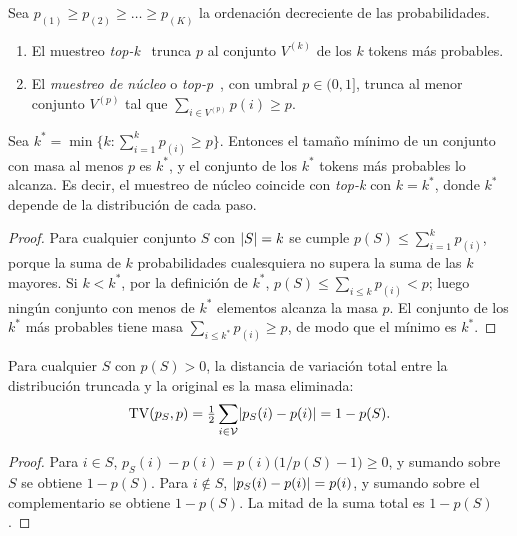 \begin{definicion}\label{def:topk-topp}
Sea $p_{(1)}\ge p_{(2)}\ge\dots\ge p_{(K)}$ la ordenación decreciente de las probabilidades.
\begin{enumerate}[label=(\alph*)]
  \item El muestreo \emph{top-k}~\cite[§5.4]{fan} trunca $p$ al conjunto $V^{(k)}$ de los $k$ tokens más probables.
  \item El \emph{muestreo de núcleo} o \emph{top-p}~\cite[§3.1]{holtzman}, con umbral $p\in(0,1]$, trunca al menor conjunto $V^{(p)}$ tal que $\sum_{i\in V^{(p)}}p(i)\ge p$.
\end{enumerate}
\end{definicion}

\begin{proposicion}\label{prop:nucleo}
Sea $k^{\ast}=\min\{k:\sum_{i=1}^{k}p_{(i)}\ge p\}$. Entonces el tamaño mínimo de un conjunto con masa al menos $p$ es $k^{\ast}$, y el conjunto de los $k^{\ast}$ tokens más probables lo alcanza. Es decir, el muestreo de núcleo coincide con \emph{top-k} con $k=k^{\ast}$, donde $k^{\ast}$ depende de la distribución de cada paso.
\end{proposicion}

\begin{proof}
Para cualquier conjunto $S$ con $\lvert S\rvert=k$ se cumple $p(S)\le\sum_{i=1}^{k}p_{(i)}$, porque la suma de $k$ probabilidades cualesquiera no supera la suma de las $k$ mayores. Si $k<k^{\ast}$, por la definición de $k^{\ast}$, $p(S)\le\sum_{i\le k}p_{(i)}<p$; luego ningún conjunto con menos de $k^{\ast}$ elementos alcanza la masa $p$. El conjunto de los $k^{\ast}$ más probables tiene masa $\sum_{i\le k^{\ast}}p_{(i)}\ge p$, de modo que el mínimo es $k^{\ast}$.
\end{proof}

\begin{proposicion}\label{prop:tv-truncada}
Para cualquier $S$ con $p(S)>0$, la distancia de variación total entre la distribución truncada y la original es la masa eliminada:
\[
\operatorname{TV}(p_S,p)=\tfrac12\sum_{i\in\mathcal{V}}\lvert p_S(i)-p(i)\rvert=1-p(S).
\]
\end{proposicion}

\begin{proof}
Para $i\in S$, $p_S(i)-p(i)=p(i)\bigl(1/p(S)-1\bigr)\ge 0$, y sumando sobre $S$ se obtiene $1-p(S)$. Para $i\notin S$, $\lvert p_S(i)-p(i)\rvert=p(i)$, y sumando sobre el complementario se obtiene $1-p(S)$. La mitad de la suma total es $1-p(S)$.
\end{proof}


